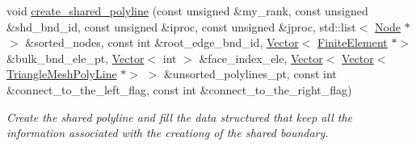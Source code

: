 \begin{DoxyCompactItemize}
void \hyperlink{classoomph_1_1TriangleMesh_ac59a791cf11147bc54b17a12a35e9707}{create\+\_\+shared\+\_\+polyline} (const unsigned \&my\+\_\+rank, const unsigned \&shd\+\_\+bnd\+\_\+id, const unsigned \&iproc, const unsigned \&jproc, std\+::list$<$ \hyperlink{classoomph_1_1Node}{Node} $\ast$$>$ \&sorted\+\_\+nodes, const int \&root\+\_\+edge\+\_\+bnd\+\_\+id, \hyperlink{classoomph_1_1Vector}{Vector}$<$ \hyperlink{classoomph_1_1FiniteElement}{Finite\+Element} $\ast$$>$ \&bulk\+\_\+bnd\+\_\+ele\+\_\+pt, \hyperlink{classoomph_1_1Vector}{Vector}$<$ int $>$ \&face\+\_\+index\+\_\+ele, \hyperlink{classoomph_1_1Vector}{Vector}$<$ \hyperlink{classoomph_1_1Vector}{Vector}$<$ \hyperlink{classoomph_1_1TriangleMeshPolyLine}{Triangle\+Mesh\+Poly\+Line} $\ast$$>$ $>$ \&unsorted\+\_\+polylines\+\_\+pt, const int \&connect\+\_\+to\+\_\+the\+\_\+left\+\_\+flag, const int \&connect\+\_\+to\+\_\+the\+\_\+right\+\_\+flag)
\begin{DoxyCompactList}\small\item\em Create the shared polyline and fill the data structured that keep all the information associated with the creationg of the shared boundary. \end{DoxyCompactList}\end{DoxyCompactItemize}
